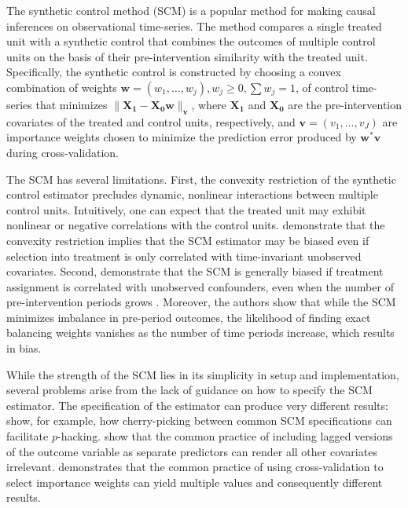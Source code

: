 \documentclass[hidelinks,12pt]{article}
\begin{document}
The synthetic control method (SCM) \citep{abadie2010synthetic} is a popular method for making causal inferences on observational time-series. The method compares a single treated unit with a synthetic control that combines the outcomes of multiple control units on the basis of their pre-intervention similarity with the treated unit. Specifically, the synthetic control is constructed by choosing a convex combination of weights $\mathbf{w} = (w_1, \ldots, w_j), w_j \geq 0, \sum w_j =1$, of control time-series that minimizes $\|\mathbf{X_1} - \mathbf{X_0} \mathbf{w}\|_\mathbf{v}$, where $\mathbf{X_1}$ and $\mathbf{X_0}$ are the pre-intervention covariates of the treated and control units, respectively, and $\mathbf{v}= (v_1, \ldots, v_J)$ are importance weights chosen to minimize the prediction error produced by $\mathbf{w}^{*} \mathbf{v}$ during cross-validation. 

The SCM has several limitations. First, the convexity restriction of the synthetic control estimator precludes dynamic, nonlinear interactions between multiple control units. Intuitively, one can expect that the treated unit may exhibit nonlinear or negative correlations with the control units. \citet{ferman2016revisiting} demonstrate that the convexity restriction implies that the SCM estimator may be biased even if selection into treatment is only correlated with time-invariant unobserved covariates. Second, \citet{ferman2018synthetic} demonstrate that the SCM is generally biased if treatment assignment is correlated with unobserved confounders, even when the number of pre-intervention periods grows \citep{ferman2018synthetic}. Moreover, the authors show that while the SCM minimizes imbalance in pre-period outcomes, the likelihood of finding exact balancing weights vanishes as the number of time periods increase, which results in bias. 

While the strength of the SCM lies in its simplicity in setup and implementation, several problems arise from the lack of guidance on how to specify the SCM estimator. The specification of the estimator can produce very different results: \citet{ferman2018cherry} show, for example, how cherry-picking between common SCM specifications can facilitate $p$-hacking.\citet{kaul2015synthetic} show that the common practice of including lagged versions of the outcome variable as separate predictors can render all other covariates irrelevant. \citet{klossner2017comparative} demonstrates that the common practice of using cross-validation to select importance weights can yield multiple values and consequently different results. 
\end{document}
